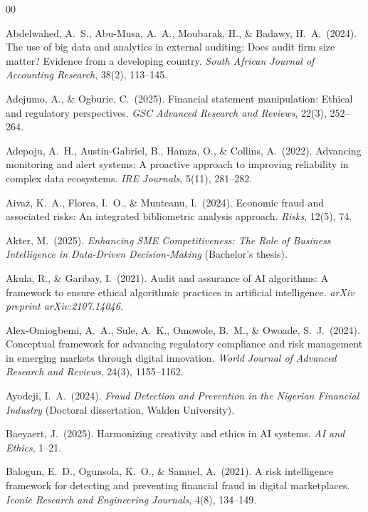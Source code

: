 \documentclass[preprint,12pt]{elsarticle}
\begin{document}
\begin{thebibliography}{00}

 Abdelwahed, A.\ S., Abu-Musa, A.\ A., Moubarak, H., \& Badawy, H.\ A.\ (2024). The use of big data and analytics in external auditing: Does audit firm size matter? Evidence from a developing country. \emph{South African Journal of Accounting Research}, 38(2), 113--145.

 Adejumo, A., \& Ogburie, C.\ (2025). Financial statement manipulation: Ethical and regulatory perspectives. \emph{GSC Advanced Research and Reviews}, 22(3), 252--264.

 Adepoju, A.\ H., Austin-Gabriel, B., Hamza, O., \& Collins, A.\ (2022). Advancing monitoring and alert systems: A proactive approach to improving reliability in complex data ecosystems. \emph{IRE Journals}, 5(11), 281--282.

 Aivaz, K.\ A., Florea, I.\ O., \& Munteanu, I.\ (2024). Economic fraud and associated risks: An integrated bibliometric analysis approach. \emph{Risks}, 12(5), 74.

 Akter, M.\ (2025). \emph{Enhancing SME Competitiveness: The Role of Business Intelligence in Data-Driven Decision-Making} (Bachelor's thesis).

 Akula, R., \& Garibay, I.\ (2021). Audit and assurance of AI algorithms: A framework to ensure ethical algorithmic practices in artificial intelligence. \emph{arXiv preprint arXiv:2107.14046}.

 Alex-Omiogbemi, A.\ A., Sule, A.\ K., Omowole, B.\ M., \& Owoade, S.\ J.\ (2024). Conceptual framework for advancing regulatory compliance and risk management in emerging markets through digital innovation. \emph{World Journal of Advanced Research and Reviews}, 24(3), 1155--1162.

 Ayodeji, I.\ A.\ (2024). \emph{Fraud Detection and Prevention in the Nigerian Financial Industry} (Doctoral dissertation, Walden University).

 Baeyaert, J.\ (2025). Harmonizing creativity and ethics in AI systems. \emph{AI and Ethics}, 1--21.

 Balogun, E.\ D., Ogunsola, K.\ O., \& Samuel, A.\ (2021). A risk intelligence framework for detecting and preventing financial fraud in digital marketplaces. \emph{Iconic Research and Engineering Journals}, 4(8), 134--149.


\end{thebibliography}
\end{document}

